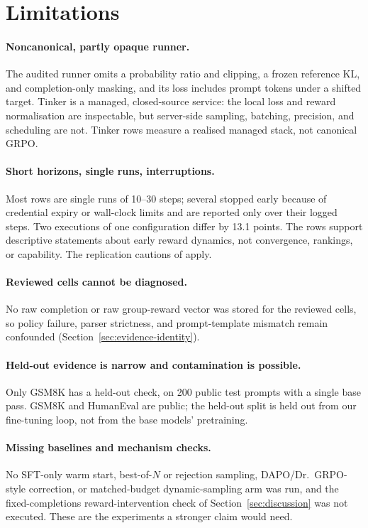 \documentclass{article}
\begin{document}
\section{Limitations}
\label{sec:limitations}

\paragraph{Noncanonical, partly opaque runner.}
The audited runner omits a probability ratio and clipping, a frozen reference
KL, and completion-only masking, and its loss includes prompt tokens under a
shifted target. Tinker is a managed, closed-source service: the local loss and
reward normalisation are inspectable, but server-side sampling, batching,
precision, and scheduling are not. Tinker rows measure a realised managed stack,
not canonical GRPO.

\paragraph{Short horizons, single runs, interruptions.}
Most rows are single runs of 10--30 steps; several stopped early because of
credential expiry or wall-clock limits and are reported only over their logged
steps. Two executions of one configuration differ by 13.1 points. The rows
support descriptive statements about early reward dynamics, not convergence,
rankings, or capability. The replication cautions of
\citet{henderson2018deep} apply.

\paragraph{Reviewed cells cannot be diagnosed.}
No raw completion or raw group-reward vector was stored for the reviewed cells,
so policy failure, parser strictness, and prompt-template mismatch remain
confounded (Section~\ref{sec:evidence-identity}).

\paragraph{Held-out evidence is narrow and contamination is possible.}
Only GSM8K has a held-out check, on 200 public test prompts with a single base
pass. GSM8K and HumanEval are public; the held-out split is held out from our
fine-tuning loop, not from the base models' pretraining.

\paragraph{Missing baselines and mechanism checks.}
No SFT-only warm start, best-of-$N$ or rejection sampling, DAPO/Dr.~GRPO-style
correction, or matched-budget dynamic-sampling arm was run, and the
fixed-completions reward-intervention check of Section~\ref{sec:discussion} was
not executed. These are the experiments a stronger claim would need.
\end{document}
